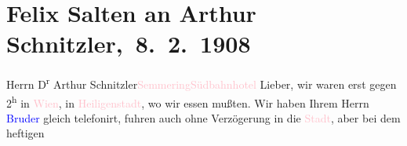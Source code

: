 

\renewcommand{\erwaehntePersonen}{Personen: Hugo von Hofmannsthal, Margarethe Kainz, Felix Salten, Julius Schnitzler, Olga Schnitzler, Louise Schnitzler, Jakob Wassermann}
\renewcommand{\erwaehnteOrte}{Orte: Biberstraße, Brünn, Heiligenstadt, I., Innere Stadt, Ordination Julius Schnitzler, Semmering, Südbahnhotel, Wien}
\renewcommand{\erwaehnteWerke}{}
\section[ Felix Salten an Arthur Schnitzler, 8. 2. 1908]{Felix Salten an Arthur Schnitzler, 8. 2. 1908}
\nopagebreak{}
\rehead{ }\normalsize\beginnumbering{}
\toendnotes[C]{\smallbreak\pagebreak[2]}
\toendnotes[C]{\smallbreak}\pstart{}{\pb}Herrn D\textsuperscript{r} Arthur Schnitzler\pend{}\pstart{}\textcolor{pink}{Semmering}{}\ledrightnote{\textcolor{pink}{Semmering}}\pend{}\pstart{}\textcolor{pink}{Südbahnhotel}{}\ledrightnote{\textcolor{pink}{Südbahnhotel}}\pend{}
{\bigskip}
\pstart
           \noindent{}Lieber, wir waren erst gegen 2\textsuperscript{h} in \textcolor{pink}{Wien}{}\ledrightnote{\textcolor{pink}{Wien}}, \label{K_L03492-1v}\label{K_L03492-1h} in \textcolor{pink}{Heiligenstadt}{}\ledrightnote{\textcolor{pink}{Heiligenstadt}}, wo wir
               essen mußten. Wir haben Ihrem Herrn \textcolor{blue}{Bruder}{}\ledrightnote{{$\rightarrow$}\textcolor{blue}{Julius Schnitzler}} gleich telefonirt, fuhren auch ohne Verzögerung in
               die \textcolor{pink}{Stadt}{}\ledrightnote{{$\rightarrow$}\textcolor{pink}{I., Innere Stadt}}, aber bei dem heftigen
